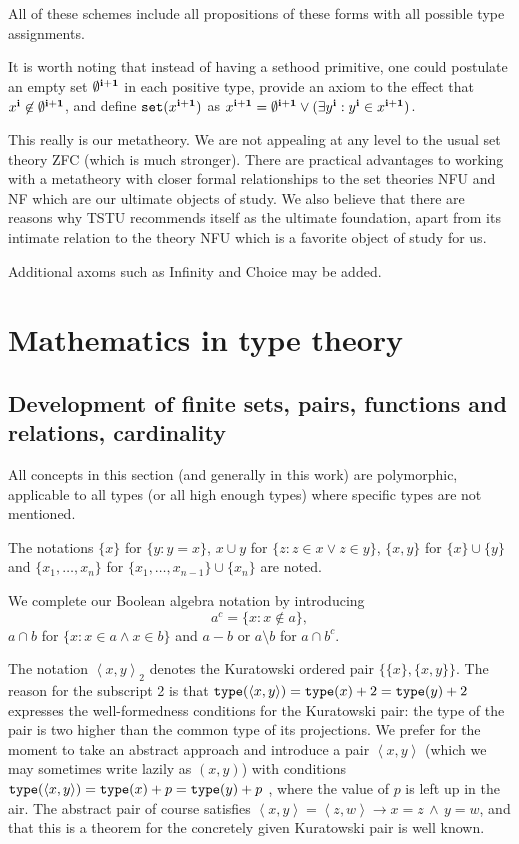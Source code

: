 \documentclass[12pt]{article}
\begin{document}
All of these schemes include all propositions of these forms with all possible type assignments.

It is worth noting that instead of having a sethood primitive, one could postulate an empty set $\emptyset^{\bf i+1}$ in each positive type, provide an axiom to the effect that $x^{\bf i} \not\in \emptyset^{\bf i+1}$, and
define ${\tt set}(x^{\bf i+1})$ as $x^{\bf i+1} = \emptyset^{\bf i+1} \vee (\exists y^{\bf i}:y^{\bf i} \in x^{\bf i+1})$.

This really is our metatheory.  We are not appealing at any level to the usual set theory ZFC (which is much stronger).  There are practical advantages to working with a metatheory with closer formal relationships to the set theories NFU and NF which are our ultimate objects of study.  We also believe that there are reasons why TSTU recommends itself as the ultimate foundation, apart from its intimate relation to the theory NFU which is a favorite object of study for us.

Additional axoms such as Infinity and Choice may be added.

\section{Mathematics in type theory}

\subsection{Development of finite sets, pairs, functions and relations, cardinality}

All concepts in this section (and generally in this work) are polymorphic, applicable to all types (or all high enough types) where specific types are not mentioned.

The notations $\{x\}$ for $\{y:y=x\}$, $x \cup y$ for $\{z:z \in x \vee z \in y\}$, $\{x,y\}$ for $\{x\} \cup \{y\}$ and $\{x_1,\ldots,x_n\}$ for $\{x_1,\ldots,x_{n-1}\} \cup \{x_n\}$ are noted.


We complete our Boolean algebra notation by introducing $$a^c = \{x:x \not\in a\},$$ $a \cap b$ for $\{x:x \in a \wedge x \in b\}$ and $a - b$ or $a \setminus b$ for $a \cap b^c$.

The notation $\left<x,y\right>_2$ denotes the Kuratowski ordered pair $\{\{x\},\{x,y\}\}$.  The reason for the subscript 2 is that ${\tt type}(\left<x,y\right>)={\tt type}(x)+2 = {\tt type}(y)+2$ expresses the well-formedness conditions for the Kuratowski pair:  the type of the pair is two higher than the common type of its projections.  We prefer for the moment to take an abstract approach and introduce a pair $\left<x,y\right>$ (which we may sometimes write lazily as $(x,y)$) with conditions  ${\tt type}(\left<x,y\right>)={\tt type}(x)+p = {\tt type}(y)+p$ , where the value of $p$ is left up in the air.  The abstract pair of course satisfies $\left<x,y\right> = \left<z,w\right>  \rightarrow x=z \,\wedge\, y=w$, and that this is a theorem for the concretely given Kuratowski pair is well known.
\end{document}
